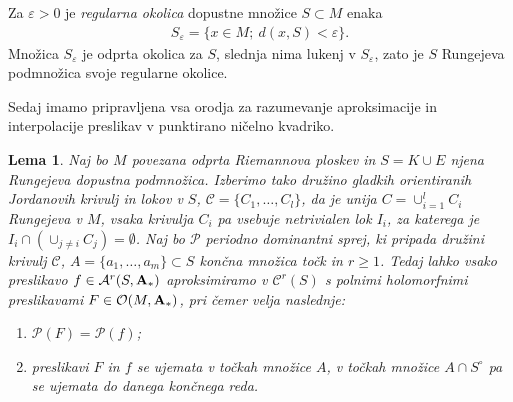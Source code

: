 \documentclass[12pt,a4paper,twoside]{article}
\theoremstyle{definition} %
\theoremstyle{plain} %
\newtheorem{lema}[definicija]{Lema}
\numberwithin{equation}{section}  %
\begin{document}
Za $\varepsilon > 0$ je \emph{regularna okolica} dopustne množice $S \subset M$ enaka
\begin{gather}
S_{\varepsilon} = \{ x \in M; \ d(x,S) < \varepsilon \}.
\end{gather}
Množica $S_{\varepsilon}$ je odprta okolica za $S$, slednja nima lukenj v $S_{\varepsilon}$, zato je $S$ Rungejeva podmnožica svoje regularne okolice.

Sedaj imamo pripravljena vsa orodja za razumevanje aproksimacije in interpolacije preslikav v punktirano ničelno kvadriko.

\begin{lema} \label{lema:aproks&interp-A*}
Naj bo $M$ povezana odprta Riemannova ploskev in $S = K \cup E$ njena Rungejeva dopustna podmnožica.
Izberimo tako družino gladkih orientiranih Jordanovih krivulj in lokov v $S$, $\mathcal{C} = \{ C_{1}, \dots , C_{l} \}$, da je unija $C = \cup_{i=1}^{l} C_{i}$ Rungejeva v $M$, vsaka krivulja $C_{i}$ pa vsebuje netrivialen lok $I_{i}$, za katerega je $I_{i} \cap (\cup_{j \neq i} C_{j}) = \emptyset$.
Naj bo $\mathcal{P}$ periodno dominantni sprej, ki pripada družini krivulj $\mathcal{C}$, $A = \{ a_{1}, \dots , a_{m} \} \subset S$ končna množica točk in $r \geq 1$.
Tedaj lahko vsako preslikavo $f \in \mathcal{A}^{r}(S, \textbf{\textup{A}}_{*})$ aproksimiramo v $\mathcal{C}^{r}(S)$ s polnimi holomorfnimi preslikavami $F \in \mathcal{O}(M,\textbf{\textup{A}}_{*})$, pri čemer velja naslednje:
\begin{enumerate}
\item $\mathcal{P}(F) = \mathcal{P}(f)$;
\item preslikavi $F$ in $f$ se ujemata v točkah množice $A$, v točkah množice $A \cap S^{\circ}$ pa se ujemata do danega končnega reda.
\end{enumerate}
\end{lema}
\end{document}
